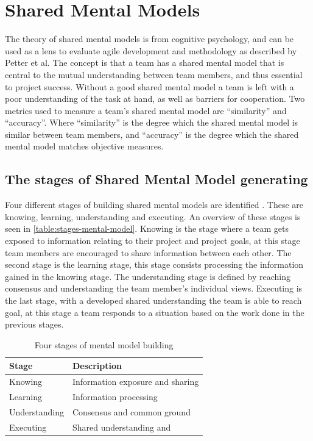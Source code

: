 \section{Shared Mental Models}

The theory of shared mental models is from cognitive psychology, and can be used as a lens to evaluate agile development and methodology as described by Petter et al\cite{Petter2013}. The concept is that a team has a shared mental model that is central to the mutual understanding between team members, and thus essential to project success. Without a good shared mental model a team is left with a poor understanding of the task at hand, as well as barriers for cooperation. Two metrics used to measure a team's shared mental model are ``similarity'' and ``accuracy''. Where ``similarity'' is the degree which the shared mental model is similar between team members, and ``accuracy'' is the degree which the shared mental model matches objective measures. 

\subsection{The stages of Shared Mental Model generating}

	
Four different stages of building shared mental models are identified \cite{Petter2013}. These are knowing, learning, understanding and executing. An overview of these stages is seen in  \autoref{table:stages-mental-model}. Knowing is the stage where a team gets exposed to information relating to their project and project goals, at this stage team members are encouraged to share information between each other. The second stage is the learning stage, this stage consists processing the information gained in the knowing stage. The understanding stage is defined by reaching consensus and understanding the team member's individual views. Executing is the last stage, with a developed shared understanding the team is able to reach goal, at this stage a team responds to a situation based on the work done in the previous stages.

\begin{table}[!h]
	\begin{centering}
	\caption{Four stages of mental model building}
	\label{table:stages-mental-model}
	\begin{tabular}{l | p{}}

	\hline
	Stage & Description \\
	\hline
	Knowing &  Information exposure and sharing\\
	Learning & Information processing \\
	Understanding & Consensus and common ground \\
	Executing & Shared understanding and  \\
	\hline
	
	
\end{tabular}
\end{centering}
\end{table}

